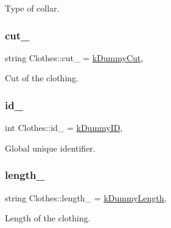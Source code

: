 Type of collar. 

\mbox{\label{classClothes_ac1c2286c8928a5eee91d818a098a44ac}} 
\subsubsection{\texorpdfstring{cut\+\_\+}{cut\_}}
{\footnotesize\ttfamily string Clothes\+::cut\+\_\+ = \mbox{\hyperlink{clothes_8h_a8a6eb066049b009439505355aeaae375}{k\+Dummy\+Cut}}\hspace{0.3cm}{\ttfamily [protected]}, {\ttfamily [inherited]}}



Cut of the clothing. 

\mbox{\label{classClothes_a8978d931db5ca47c3ccea30def4ae83e}} 
\subsubsection{\texorpdfstring{id\+\_\+}{id\_}}
{\footnotesize\ttfamily int Clothes\+::id\+\_\+ = \mbox{\hyperlink{clothes_8h_a77186917343a417a2369cdff0bc86d31}{k\+Dummy\+ID}}\hspace{0.3cm}{\ttfamily [protected]}, {\ttfamily [inherited]}}



Global unique identifier. 

\mbox{\label{classClothes_ae02603eda727e33caf46ec30e761e3c3}} 
\subsubsection{\texorpdfstring{length\+\_\+}{length\_}}
{\footnotesize\ttfamily string Clothes\+::length\+\_\+ = \mbox{\hyperlink{clothes_8h_a1624256dcecfb0995a74c36142593770}{k\+Dummy\+Length}}\hspace{0.3cm}{\ttfamily [protected]}, {\ttfamily [inherited]}}



Length of the clothing. 

\mbox{\label{classClothes_adbb9ed311f14ccbb1e4fe0e8378a95d4}} 
